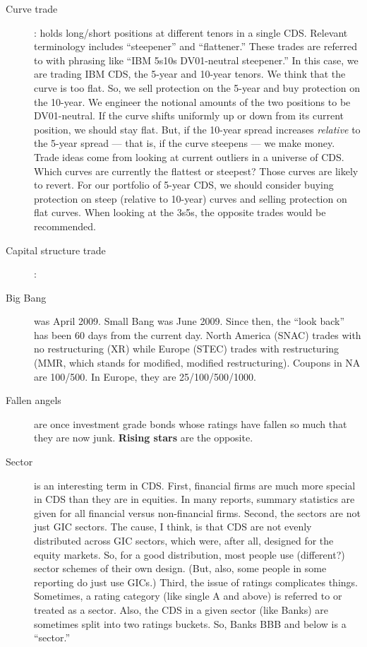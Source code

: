 \documentclass[12pt]{article}
\begin{document}
\begin{description}
  \item[Curve trade]: holds long/short positions at different tenors in a single CDS. Relevant terminology includes ``steepener'' and ``flattener.'' These trades are referred to with phrasing like ``IBM 5s10s DV01-neutral steepener.'' In this case, we are trading IBM CDS, the 5-year and 10-year tenors. We think that the curve is too flat. So, we sell protection on the 5-year and buy protection on the 10-year. We engineer the notional amounts of the two positions to be DV01-neutral. If the curve shifts uniformly up or down from its current position, we should stay flat. But, if the 10-year spread increases \emph{relative} to the 5-year spread --- that is, if the curve steepens --- we make money. Trade ideas come from looking at current outliers in a universe of CDS. Which curves are currently the flattest or steepest? Those curves are likely to revert. For our portfolio of 5-year CDS, we should consider buying protection on steep (relative to 10-year) curves and selling protection on flat curves. When looking at the 3s5s, the opposite trades would be recommended.

  \item[Capital structure trade]: 

  \item[Big Bang] was April 2009. Small Bang was June 2009. Since then, the ``look back'' has been 60 days from the current day. North America (SNAC) trades with no restructuring (XR) while Europe (STEC) trades with restructuring (MMR, which stands for modified, modified restructuring). Coupons in NA are 100/500. In Europe, they are 25/100/500/1000.
  
  \item[Fallen angels] are once investment grade bonds whose ratings have fallen so much that they are now junk. \textbf{Rising stars} are the opposite.

  \item[Sector] is an interesting term in CDS. First, financial firms are much more special in CDS than they are in equities. In many reports, summary statistics are given for all financial versus non-financial firms. Second, the sectors are not just GIC sectors. The cause, I think, is that CDS are not evenly distributed across GIC sectors, which were, after all, designed for the equity markets. So, for a good distribution, most people use (different?) sector schemes of their own design. (But, also, some people in some reporting do just use GICs.) Third, the issue of ratings complicates things. Sometimes, a rating category (like single A and above) is referred to or treated as a sector. Also, the CDS in a given sector (like Banks) are sometimes split into two ratings buckets. So, Banks BBB and below is a ``sector.''
  
\end{description}
\end{document}
